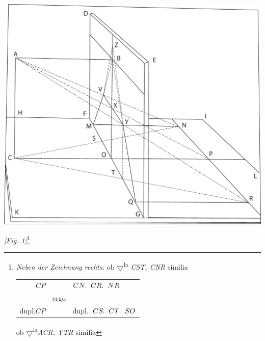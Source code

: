 \pend
\newpage [p.~15]
\begin{center}
\includegraphics[width=1\textwidth]{images/Aleaume_15}
\\\rule[-4mm]{0mm}{10mm}\textit{[Fig. 1]}\footnote{\textit{Neben der Zeichnung rechts:} ob $\bigtriangledown$\textsuperscript{la} \textit{CST, CNR} similia \\
\protect\begin{tabular}{rcl}$CP$&&$CN.\hspace{5.5pt}CR.\hspace{5.5pt} NR$\\&ergo&\\dupl.\hspace{5.5pt}$CP$&&dupl.$\hspace{5.5pt} CS.\hspace{5.5pt} CT.\hspace{5.5pt} SO$ \protect\end{tabular} 
ob $\bigtriangledown$\textsuperscript{la}\textit{ACR, YTR} similia} 
\end{center}
\pstart
                 